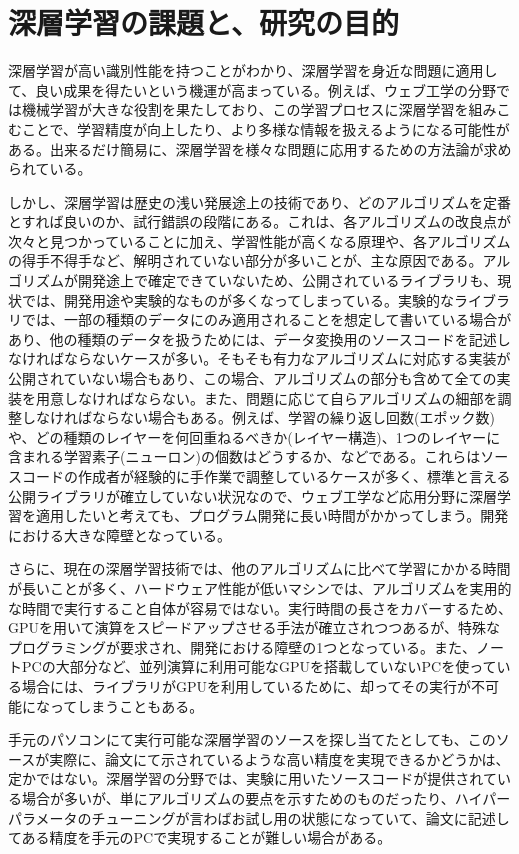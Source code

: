 \section{深層学習の課題と、研究の目的}
深層学習が高い識別性能を持つことがわかり、深層学習を身近な問題に適用して、良い成果を得たいという機運が高まっている。例えば、ウェブ工学の分野では機械学習が大きな役割を果たしており、この学習プロセスに深層学習を組みこむことで、学習精度が向上したり、より多様な情報を扱えるようになる可能性がある。出来るだけ簡易に、深層学習を様々な問題に応用するための方法論が求められている。\par
しかし、深層学習は歴史の浅い発展途上の技術であり、どのアルゴリズムを定番とすれば良いのか、試行錯誤の段階にある。これは、各アルゴリズムの改良点が次々と見つかっていることに加え、学習性能が高くなる原理や、各アルゴリズムの得手不得手など、解明されていない部分が多いことが、主な原因である。アルゴリズムが開発途上で確定できていないため、公開されているライブラリも、現状では、開発用途や実験的なものが多くなってしまっている。実験的なライブラリでは、一部の種類のデータにのみ適用されることを想定して書いている場合があり、他の種類のデータを扱うためには、データ変換用のソースコードを記述しなければならないケースが多い。そもそも有力なアルゴリズムに対応する実装が公開されていない場合もあり、この場合、アルゴリズムの部分も含めて全ての実装を用意しなければならない。また、問題に応じて自らアルゴリズムの細部を調整しなければならない場合もある。例えば、学習の繰り返し回数(エポック数)や、どの種類のレイヤーを何回重ねるべきか(レイヤー構造)、1つのレイヤーに含まれる学習素子(ニューロン)の個数はどうするか、などである。これらはソースコードの作成者が経験的に手作業で調整しているケースが多く、標準と言える公開ライブラリが確立していない状況なので、ウェブ工学など応用分野に深層学習を適用したいと考えても、プログラム開発に長い時間がかかってしまう。開発における大きな障壁となっている。\par
さらに、現在の深層学習技術では、他のアルゴリズムに比べて学習にかかる時間が長いことが多く、ハードウェア性能が低いマシンでは、アルゴリズムを実用的な時間で実行すること自体が容易ではない。実行時間の長さをカバーするため、GPUを用いて演算をスピードアップさせる手法が確立されつつあるが、特殊なプログラミングが要求され、開発における障壁の1つとなっている。また、ノートPCの大部分など、並列演算に利用可能なGPUを搭載していないPCを使っている場合には、ライブラリがGPUを利用しているために、却ってその実行が不可能になってしまうこともある。\par
手元のパソコンにて実行可能な深層学習のソースを探し当てたとしても、このソースが実際に、論文にて示されているような高い精度を実現できるかどうかは、定かではない。深層学習の分野では、実験に用いたソースコードが提供されている場合が多いが、単にアルゴリズムの要点を示すためのものだったり、ハイパーパラメータのチューニングが言わばお試し用の状態になっていて、論文に記述してある精度を手元のPCで実現することが難しい場合がある。\par
